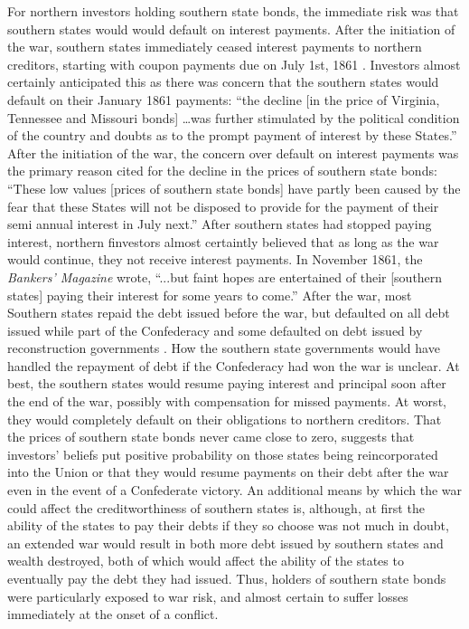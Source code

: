 \documentclass[11pt, oneside, article]{memoir}\usepackage[]{graphicx}\usepackage[]{color}
\begin{document}
For northern investors holding southern state bonds, the immediate risk was that southern states would would default on interest payments.
After the initiation of the war, southern states immediately ceased interest payments to northern creditors, starting with coupon payments due on July 1st, 1861 \parencites[947]{BankersMagazine1861}[159]{BankersMagazine1862}.
Investors almost certainly anticipated this as there was concern that the southern states would default on their January 1861 payments: ``the decline [in the price of Virginia, Tennessee and Missouri bonds] \dots was further stimulated by the political condition of the country and doubts as to the prompt payment of interest by these States.'' \parencite[756]{BankersMagazine1861}
After the initiation of the war, the concern over default on interest payments was the primary reason cited for the decline in the prices of southern state bonds: ``These low values [prices of southern state bonds] have partly been caused by the fear that these States will not be disposed to provide for the payment of their semi annual interest in July next.'' \parencite[947]{BankersMagazine1861}
After southern states had stopped paying interest, northern finvestors almost certaintly believed that as long as the war would continue, they not receive interest payments.
In November 1861, the \textit{Bankers' Magazine} wrote, ``...but faint hopes are entertained of their [southern states] paying their interest for some years to come.'' \parencite[559]{BankersMagazine1862}
After the war, most Southern states repaid the debt issued before the war, but defaulted on all debt issued while part of the Confederacy and some defaulted on debt issued by reconstruction governments \parencites{Randolph1931}{Ratchford1941}.
How the southern state governments would have handled the repayment of debt if the Confederacy had won the war is unclear.
At best, the southern states would resume paying interest and principal soon after the end of the war, possibly with compensation for missed payments.
At worst, they would completely default on their obligations to northern creditors.
That the prices of southern state bonds never came close to zero, suggests that investors' beliefs put positive probability on those states being reincorporated into the Union or that they would resume payments on their debt after the war even in the event of a Confederate victory.
An additional means by which the war could affect the creditworthiness of southern states is, although, at first the ability of the states to pay their debts if they so choose was not much in doubt, an extended war would result in both more debt issued by southern states and wealth destroyed, both of which would affect the ability of the states to eventually pay the debt they had issued.
Thus, holders of southern state bonds were particularly exposed to war risk, and almost certain to suffer losses immediately at the onset of a conflict.
\end{document}
